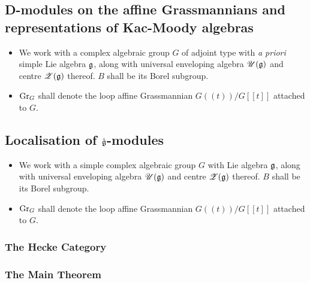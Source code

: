         \subsection{D-modules on the affine Grassmannians and representations of Kac-Moody algebras}
            \begin{convention}
                \noindent
                \begin{itemize}
                    \item We work with a complex algebraic group $G$ of adjoint type with \textit{a priori} simple Lie algebra $\mathfrak{g}$, along with universal enveloping algebra $\mathscr{U}(\mathfrak{g})$ and centre $\mathscr{Z}(\mathfrak{g})$ thereof. $B$ shall be its Borel subgroup. 
                    \item $\mathrm{Gr}_G$ shall denote the loop affine Grassmannian $G(\!(t)\!)/G[\![t]\!]$ attached to $G$.
                \end{itemize}
            \end{convention}
            
        \subsection{Localisation of \texorpdfstring{$\hat{\mathfrak{g}}$}{}-modules}
            \begin{convention}
                \noindent
                \begin{itemize}
                    \item We work with a simple complex algebraic group $G$ with Lie algebra $\mathfrak{g}$, along with universal enveloping algebra $\mathscr{U}(\mathfrak{g})$ and centre $\mathscr{Z}(\mathfrak{g})$ thereof. $B$ shall be its Borel subgroup. 
                    \item $\mathrm{Gr}_G$ shall denote the loop affine Grassmannian $G(\!(t)\!)/G[\![t]\!]$ attached to $G$.
                \end{itemize}
            \end{convention}
            
            \subsubsection{The Hecke Category}
            
            \subsubsection{The Main Theorem}